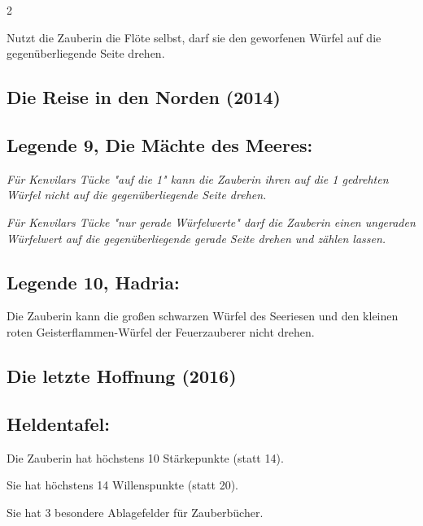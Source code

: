 \documentclass[10pt, a4paper, oneside]{book}
\newcommand{\fan}[1]{\textit{#1}}
\begin{document}
\begin{multicols*}{2}
\begin{bgcolor}
Nutzt die Zauberin die Flöte selbst, darf sie den geworfenen Würfel auf die gegenüberliegende Seite drehen.
\supercite{StSch:Gaben,StSch:Begleitheft}

\end{bgcolor}


\begin{bgcolor}
\section{Die Reise in den Norden (2014)}


\subsection{Legende 9, Die Mächte des Meeres:}

\fan{Für Kenvilars Tücke "auf die 1" kann die Zauberin ihren auf die 1 gedrehten Würfel nicht auf die gegenüberliegende Seite drehen.}

\fan{Für Kenvilars Tücke "nur gerade Würfelwerte" darf die Zauberin einen ungeraden Würfelwert auf die gegenüberliegende gerade Seite drehen und zählen lassen.}
 

\subsection{Legende 10, Hadria:}

Die Zauberin kann die großen schwarzen Würfel des Seeriesen\supercite{DRidN10:Turm_bewahrt} und den kleinen roten Geisterflammen-Würfel der Feuerzauberer\supercite{DRidN10:Geisterflammen} nicht drehen.

\end{bgcolor}




\begin{bgcolor}
\section{Die letzte Hoffnung (2016)}

\subsection{Heldentafel:}

Die Zauberin hat höchstens 10 Stärkepunkte (statt 14).

Sie hat höchstens 14 Willenspunkte (statt 20).

Sie hat 3 besondere Ablagefelder für Zauberbücher.





\end{bgcolor}
\end{multicols*}
\end{document}
